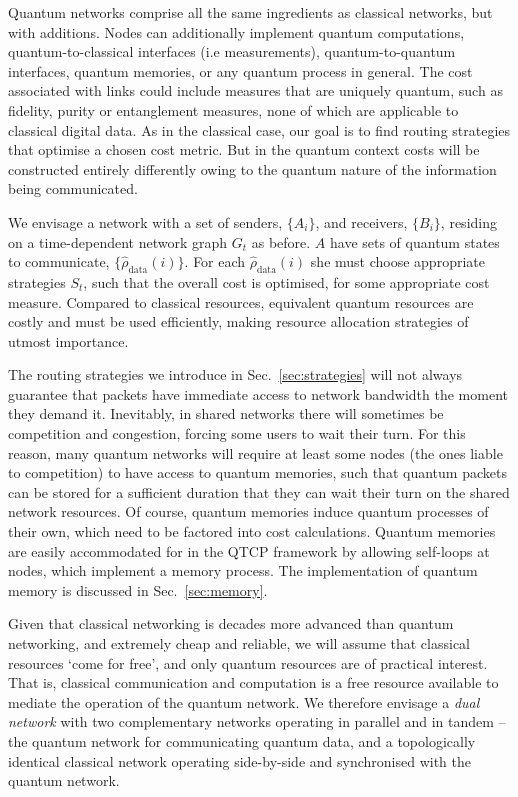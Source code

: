 \documentclass[aps,rmp,twocolumn,amsmath,amssymb,nofootinbib,superscriptaddress]{revtex4}
\begin{document}
Quantum networks comprise all the same ingredients as classical networks, but with additions. Nodes can additionally implement quantum computations, quantum-to-classical interfaces (i.e measurements), quantum-to-quantum interfaces, quantum memories, or any quantum process in general. The cost associated with links could include measures that are uniquely quantum, such as fidelity, purity or entanglement measures, none of which are applicable to classical digital data. As in the classical case, our goal is to find routing strategies that optimise a chosen cost metric. But in the quantum context costs will be constructed entirely differently owing to the quantum nature of the information being communicated.

We envisage a network with a set of senders, $\{A_i\}$, and receivers, $\{B_i\}$, residing on a time-dependent network graph $G_t$ as before. $A$ have sets of quantum states to communicate, $\{\hat\rho_\mathrm{data}(i)\}$. For each $\hat\rho_\mathrm{data}(i)$ she must choose appropriate strategies $S_t$, such that the overall cost is optimised, for some appropriate cost measure. Compared to classical resources, equivalent quantum resources are costly and must be used efficiently, making resource allocation strategies of utmost importance.

The routing strategies we introduce in Sec.~\ref{sec:strategies} will not always guarantee that packets have immediate access to network bandwidth the moment they demand it. Inevitably, in shared networks there will sometimes be competition and congestion, forcing some users to wait their turn. For this reason, many quantum networks will require at least some nodes (the ones liable to competition) to have access to quantum memories, such that quantum packets can be stored for a sufficient duration that they can wait their turn on the shared network resources. Of course, quantum memories induce quantum processes of their own, which need to be factored into cost calculations. Quantum memories are easily accommodated for in the QTCP framework by allowing self-loops at nodes, which implement a memory process. The implementation of quantum memory is discussed in Sec.~\ref{sec:memory}.

Given that classical networking is decades more advanced than quantum networking, and extremely cheap and reliable, we will assume that classical resources `come for free', and only quantum resources are of practical interest. That is, classical communication and computation is a free resource available to mediate the operation of the quantum network. We therefore envisage a \emph{dual network} with two complementary networks operating in parallel and in tandem -- the quantum network for communicating quantum data, and a topologically identical classical network operating side-by-side and synchronised with the quantum network.
\end{document}
